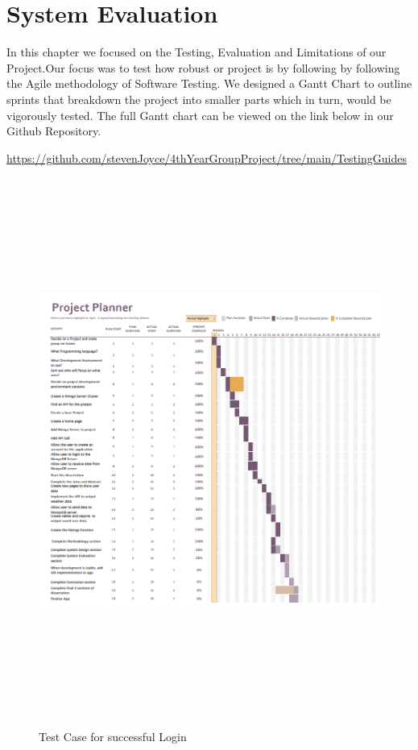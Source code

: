 \chapter{System Evaluation}
In this chapter we focused on the Testing, Evaluation and Limitations of our Project.Our focus was to test how robust or project is by following by following the Agile methodology of Software Testing. We designed a Gantt Chart to outline sprints that breakdown the project into smaller parts which in turn, would be vigorously tested. The full Gantt chart can be viewed on the link below in our Github Repository.
\newline

\url{https://github.com/stevenJoyce/4thYearGroupProject/tree/main/TestingGuides}

\begin{figure}[H]
    \centering
    \includegraphics[width=15cm, height = 18cm]{img/Gantt.PNG}
    \caption{Test Case for successful Login}
    \label{fig:altas config}
\end{figure}
